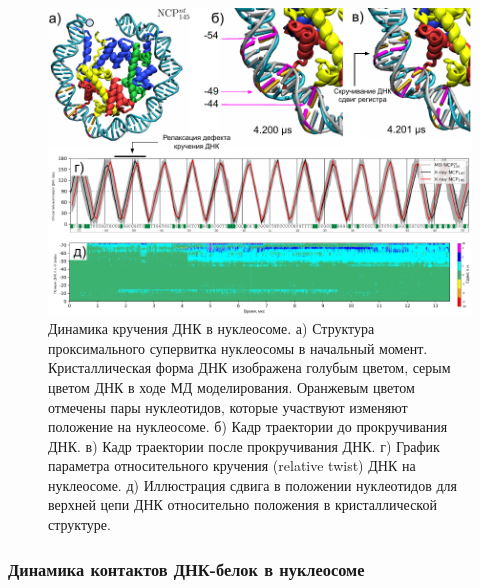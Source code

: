 \begin{figure}[H]
    \centering
    \includegraphics[width=\textwidth]{images/p2/10ms/fig5.pdf}
    \caption[Динамика кручения ДНК в нуклеосоме]{Динамика кручения ДНК в нуклеосоме. а) Структура проксимального супервитка нуклеосомы в начальный момент. Кристаллическая форма ДНК изображена голубым цветом, серым цветом ДНК в ходе МД моделирования. Оранжевым цветом отмечены пары нуклеотидов, которые участвуют изменяют положение на нуклеосоме. б) Кадр траектории до прокручивания ДНК. в) Кадр траектории после прокручивания ДНК. г) График параметра относительного кручения (relative twist) ДНК на нуклеосоме. д) Иллюстрация сдвига в положении нуклеотидов для верхней цепи ДНК относительно положения в кристаллической структуре.}
    \label{fig:p2_3:f5}
\end{figure}



\subsubsection{Динамика контактов ДНК-белок в нуклеосоме}

